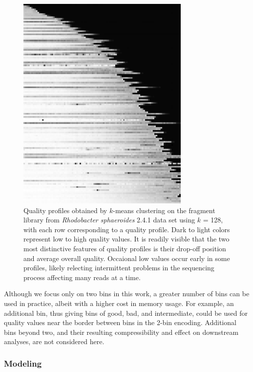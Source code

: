 \documentclass{bioinfo}
\begin{document}
\begin{methods}
\begin{figure}[!tpb]
\centerline{\includegraphics[width=3.35in]{profiles_128.eps}}
\caption{Quality profiles obtained by $k$-means clustering on the
  fragment library from \textit{Rhodobacter sphaeroides} 2.4.1 data
  set using $k$ = 128, with each row corresponding to a quality
  profile. Dark to light colors represent low to high quality
  values. It is readily visible that the two most distinctive features
  of quality profiles is their drop-off position and average overall
  quality. Occaional low values occur early in some profiles, likely
  relecting intermittent problems in the sequencing process affecting
  many reads at a time.}\label{fig:profiles_128}
\end{figure}

Although we focus only on two bins in this work, a greater number of
bins can be used in practice, albeit with a higher cost in memory
usage. For example, an additional bin, thus giving bins of good, bad,
and intermediate, could be used for quality values near the border
between bins in the 2-bin encoding. Additional bins beyond two, and
their resulting compressibility and effect on downstream analyses, are
not considered here.

\subsubsection{Modeling}


\end{methods}
\end{document}
